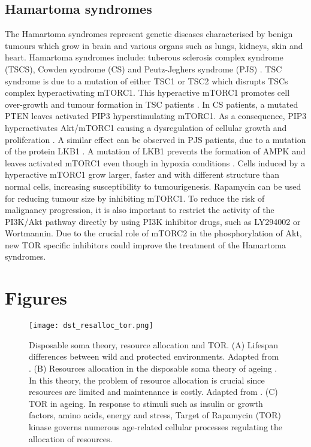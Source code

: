\subsection{Hamartoma syndromes}
\label{subsec:Hamartoma syndromes}
The Hamartoma syndromes represent genetic diseases characterised by benign tumours which grow in brain and various organs such as lungs, kidneys, skin and heart. Hamartoma syndromes include: tuberous sclerosis complex syndrome (TSCS), Cowden syndrome (CS) and Peutz-Jeghers syndrome (PJS) \citep{Inoki2005}. TSC syndrome is due to a mutation of either TSC1 or TSC2 which disrupts TSCs complex hyperactivating mTORC1. This hyperactive mTORC1 promotes cell over-growth and tumour formation in TSC patients \citep{Umeoka2008}. In CS patients, a mutated PTEN leaves activated PIP3 hyperstimulating mTORC1. As a consequence, PIP3 hyperactivates Akt/mTORC1 causing a dysregulation of cellular growth and proliferation \citep{Pilarski2009}. A similar effect can be observed in PJS patients, due to a mutation of the protein LKB1 \citep{Beggs2010}. A mutation of LKB1 prevents the formation of AMPK and leaves activated mTORC1 even though in hypoxia conditions \citep{Krymskaya2009}. Cells induced by a hyperactive mTORC1 grow 
larger, faster and with different structure than normal cells, increasing susceptibility to tumourigenesis. Rapamycin can be used for reducing tumour size by inhibiting mTORC1. To reduce the risk of malignancy progression, it is also important to restrict the activity of the PI3K/Akt pathway directly by using PI3K inhibitor drugs, such as LY294002 or Wortmannin. Due to the crucial role of mTORC2 in the phosphorylation of Akt, new TOR specific inhibitors could improve the treatment of the Hamartoma syndromes.


\section{Figures}
\label{chap2:Figures}

\clearpage

\begin{figure}[tb]
	\begin{center}
		\texttt{[image: dst\_resalloc\_tor.png]}
		\caption[Disposable soma theory, resource allocation and TOR]{Disposable soma theory, resource allocation and TOR. (A) Lifespan differences between wild and protected environments. Adapted from \citep[Fig. 1]{Kirkwood2008}. (B) Resources allocation in the disposable soma theory of ageing \citep{Kirkwood1977, Kirkwood1981,Kirkwood2008}. In this theory, the problem of resource allocation is crucial since resources are limited and maintenance is costly. Adapted from \citep[Fig. 3]{Kirkwood2008}. (C) TOR in ageing. In response to stimuli such as insulin or growth factors, amino acids, energy and stress, Target of Rapamycin (TOR) kinase governs numerous age-related cellular processes regulating the allocation of resources.}
		\label{fig:dst_resalloc_tor}
	\end{center}
\end{figure}

